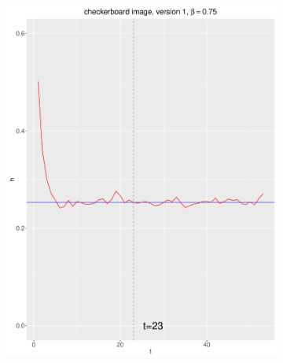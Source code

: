\documentclass[12pt, oneside]{article}   	%
\begin{document}
\begin{figure}[H]
\begin{subfigure}[b]{0.475\textwidth}
            \includegraphics[width=\textwidth, height=0.32\textheight]{check_v1_75.pdf}
        \end{subfigure} \\
        \begin{subfigure}[b]{0.475\textwidth}
            \centering

\end{subfigure}
\end{figure}
\end{document}
